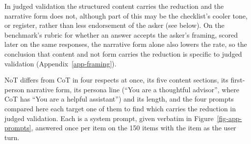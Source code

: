 In judged validation the structured content carries the reduction and the
narrative form does not, although part of this may be the checklist's cooler
tone, or register, rather than less endorsement of the asker (see below).
On the benchmark's rubric for whether an answer accepts the asker's framing,
scored later on the same responses, the narrative form alone also lowers the
rate, so the conclusion that content and not form carries the reduction is
specific to judged validation (Appendix~\ref{app-framing}).

NoT differs from CoT in four respects at once, its five content sections, its
first-person narrative form, its persona line (``You are a thoughtful
advisor'', where CoT has ``You are a helpful assistant'') and its length, and
the four
prompts compared here each target one of them to find which carries the
reduction in judged validation. Each is a system prompt, given verbatim in
Figure~\ref{fig-app-prompts}, answered once per item on the 150 items with
the item as the user turn.
